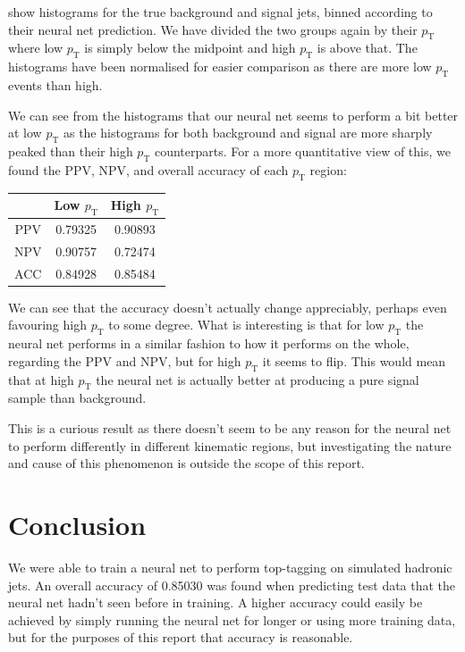 \documentclass[11pt]{article}
\numberwithin{equation}{section}
\numberwithin{figure}{section}
\numberwithin{table}{section}
\begin{document}
 show histograms for the true background and signal jets, binned according to their neural net prediction. We have divided the two groups again by their $p_\mathrm{T}$ where low $p_\mathrm{T}$ is simply below the midpoint and high $p_\mathrm{T}$ is above that. The histograms have been normalised for easier comparison as there are more low $p_\mathrm{T}$ events than high. 

We can see from the histograms that our neural net seems to perform a bit better at low $p_\mathrm{T}$ as the histograms for both background and signal are more sharply peaked than their high $p_\mathrm{T}$ counterparts. For a more quantitative view of this, we found the PPV, NPV, and overall accuracy of each $p_\mathrm{T}$ region:

\begin{table}[H]
    \centering
    \begin{tabular}{c|c|c}
         & Low $p_\mathrm{T}$ & High $p_\mathrm{T}$  \\ \hline
        PPV & 0.79325 & 0.90893 \\ 
        NPV & 0.90757 & 0.72474 \\
        ACC & 0.84928 & 0.85484
    \end{tabular}
\end{table}

We can see that the accuracy doesn't actually change appreciably, perhaps even favouring high $p_\mathrm{T}$ to some degree. What is interesting is that for low $p_\mathrm{T}$ the neural net performs in a similar fashion to how it performs on the whole, regarding the PPV and NPV, but for high $p_\mathrm{T}$ it seems to flip. This would mean that at high $p_\mathrm{T}$ the neural net is actually better at producing a pure signal sample than background. 

This is a curious result as there doesn't seem to be any reason for the neural net to perform differently in different kinematic regions, but investigating the nature and cause of this phenomenon is outside the scope of this report. 

\section{Conclusion}\label{sec:Conclusion}
We were able to train a neural net to perform top-tagging on simulated hadronic jets. An overall accuracy of 0.85030 was found when predicting test data that the neural net hadn't seen before in training. A higher accuracy could easily be achieved by simply running the neural net for longer or using more training data, but for the purposes of this report that accuracy is reasonable. 
\end{document}
